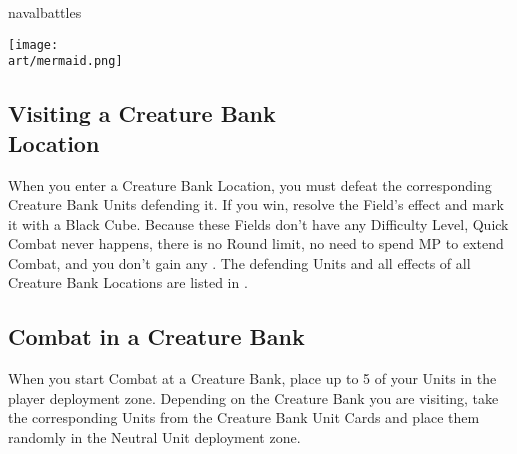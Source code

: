 \begin{expansion}[before=\vspace*{-11mm}]{navalbattles}
\begin{multicols*}{2}
        \begin{center}
            \texttt{[image: \\art/mermaid.png]}
        \end{center}
        \columnbreak

    \subsection*{Visiting a Creature Bank\\Location}
    When you enter a Creature Bank Location, you must defeat the corresponding Creature Bank Units defending it.
    If you win, resolve the Field's effect and mark it with a Black Cube.
    Because these Fields don't have any Difficulty Level, Quick Combat never happens, there is no Round limit, no need to spend MP to extend Combat, and you don't gain any .
    The defending Units and all effects of all Creature Bank Locations are listed in .

    \subsection*{Combat in a Creature Bank}
    When you start Combat at a Creature Bank, place up to 5 of your Units in the player deployment zone.
    Depending on the Creature Bank you are visiting, take the corresponding Units from the Creature Bank Unit Cards and place them randomly in the Neutral Unit deployment zone.


\end{multicols*}
\end{expansion}
